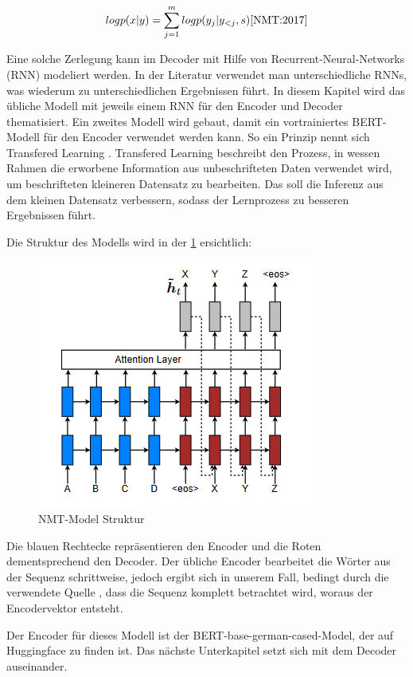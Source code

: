 \begin{equation}
	logp(x|y) = \sum_{j=1}^m logp(y_j|y_{<j}, s) \cite{NMT:2017}
\end{equation}

Eine solche Zerlegung kann im Decoder mit Hilfe von Recurrent-Neural-Networks (RNN) modeliert werden. In der Literatur verwendet man unterschiedliche RNNs, was wiederum zu unterschiedlichen Ergebnissen führt. In diesem Kapitel wird das übliche Modell mit jeweils einem RNN für den Encoder und Decoder thematisiert. Ein zweites Modell wird gebaut, damit ein vortrainiertes BERT-Modell für den Encoder verwendet werden kann. So ein Prinzip nennt sich Transfered Learning \cite{transfered_learning:22}. Transfered Learning beschreibt den Prozess, in wessen Rahmen die erworbene Information aus unbeschrifteten Daten verwendet wird, um beschrifteten kleineren Datensatz zu bearbeiten. Das soll die Inferenz aus dem kleinen Datensatz verbessern, sodass der Lernprozess zu besseren Ergebnissen führt. 

Die Struktur des Modells wird in der \cref{fig:NMT_Model} ersichtlich:

\begin{figure}[H]
	\centering
	\includegraphics[scale=0.85]{images/NMT-Model.png}
	\caption{NMT-Model Struktur \cite{NMT:2017}}
	\label{fig:NMT_Model}
\end{figure}

Die blauen Rechtecke repräsentieren den Encoder und die Roten dementsprechend den Decoder. Der übliche Encoder bearbeitet die Wörter aus der Sequenz schrittweise, jedoch ergibt sich in unserem Fall, bedingt durch die verwendete Quelle \cite{NMT&ATT:22}, dass die Sequenz komplett betrachtet wird, woraus der Encodervektor entsteht.

Der Encoder für dieses Modell ist der BERT-base-german-cased-Model, der auf Huggingface \cite{bert_based:19} zu finden ist. Das nächste Unterkapitel setzt sich mit dem Decoder auseinander.

